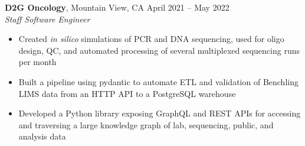 \documentclass[margin,line]{resume}
\begin{document}
\begin{resume}
    \textbf{D2G Oncology}, Mountain View, CA \hfill\vspace{1mm}\hfill April 2021 -- May 2022\\%
    \textsl{Staff Software Engineer}
    \begin{itemize}
    \item Created \textit{in silico} simulations of PCR and DNA sequencing, used for oligo design, QC, and automated processing of several multiplexed sequencing runs per month
    \item Built a pipeline using pydantic to automate ETL and validation of Benchling LIMS data from an HTTP API to a PostgreSQL warehouse
    \item Developed a Python library exposing GraphQL and REST APIs for accessing and traversing a large knowledge graph of lab, sequencing, public, and analysis data
    \end{itemize}


\end{resume}
\end{document}
